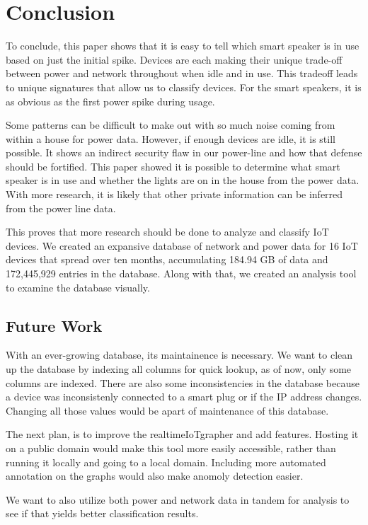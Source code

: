 \chapter{Conclusion}
\label{Conclusion}

To conclude, this paper shows that it is easy to tell which smart speaker is in use based on just the initial spike. Devices are each making their unique trade-off between power and network throughout when idle and in use. This tradeoff leads to unique signatures that allow us to classify devices. For the smart speakers, it is as obvious as the first power spike during usage.

Some patterns can be difficult to make out with so much noise coming from within a house for power data. However, if enough devices are idle, it is still possible. It shows an indirect security flaw in our power-line and how that defense should be fortified. This paper showed it is possible to determine what smart speaker is in use and whether the lights are on in the house from the power data. With more research, it is likely that other private information can be inferred from the power line data.

This proves that more research should be done to analyze and classify IoT devices. We created an expansive database of network and power data for 16 IoT devices that spread over ten months, accumulating 184.94 GB of data and 172,445,929 entries in the database. Along with that, we created an analysis tool to examine the database visually.

\section{Future Work}
With an ever-growing database, its maintainence is necessary. We want to clean up the database by indexing all columns for quick lookup, as of now, only some columns are indexed. There are also some inconsistencies in the database because a device was inconsistenly connected to a smart plug or if the IP address changes. Changing all those values would be apart of maintenance of this database.

The next plan, is to improve the realtimeIoTgrapher and add features. Hosting it on a public domain would make this tool more easily accessible, rather than running it locally and going to a local domain. Including more automated annotation on the graphs would also make anomoly detection easier.

We want to also utilize both power and network data in tandem for analysis to see if that yields better classification results.

